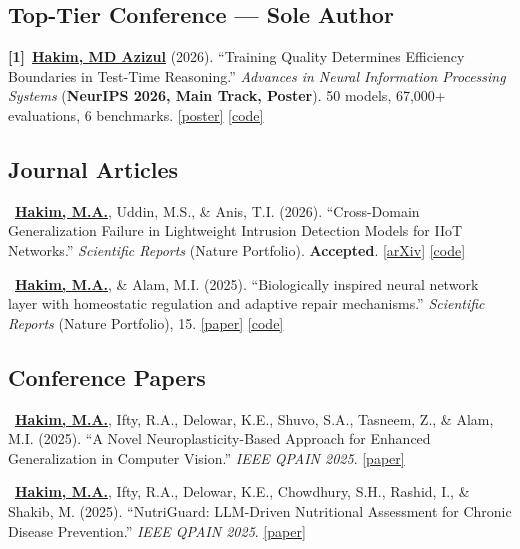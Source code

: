 \documentclass[10pt, a4paper]{article}
\begin{document}
\subsection*{Top-Tier Conference --- Sole Author}
\noindent
\textbf{[1]}\ \underline{\textbf{Hakim, MD Azizul}} (2026).
``Training Quality Determines Efficiency Boundaries in Test-Time Reasoning.''
\textit{Advances in Neural Information Processing Systems} (\textbf{NeurIPS 2026, Main Track, Poster}).
50 models, 67{,}000+ evaluations, 6 benchmarks.
\href{https://neurips.cc/virtual/2026/loc/sydney/poster/150721}{[poster]}
\href{https://github.com/logicsame/Training-Quality-Determines-Efficiency-Boundaries-in-Test-Time-Reasoning}{[code]}

\subsection*{Journal Articles}
\noindent
[J1]\ \underline{\textbf{Hakim, M.A.}}, Uddin, M.S., \& Anis, T.I. (2026).
``Cross-Domain Generalization Failure in Lightweight Intrusion Detection Models for IIoT Networks.''
\textit{Scientific Reports} (Nature Portfolio). \textbf{Accepted}.
\href{https://arxiv.org/abs/2607.00553}{[arXiv]}
\href{https://github.com/logicsame/Cross-Domain-Generalization-Failure-in-Lightweight-Intrusion-Detection-Models-for-IIoT-Networks}{[code]}

\smallskip
\noindent
[J2]\ \underline{\textbf{Hakim, M.A.}}, \& Alam, M.I. (2025).
``Biologically inspired neural network layer with homeostatic regulation and adaptive repair mechanisms.''
\textit{Scientific Reports} (Nature Portfolio), 15.
\href{https://doi.org/10.1038/s41598-025-09114-8}{[paper]}
\href{https://github.com/logicsame/bio-logical-self-healing-neural-system}{[code]}

\subsection*{Conference Papers}
\noindent
[C1]\ \underline{\textbf{Hakim, M.A.}}, Ifty, R.A., Delowar, K.E., Shuvo, S.A., Tasneem, Z., \& Alam, M.I. (2025).
``A Novel Neuroplasticity-Based Approach for Enhanced Generalization in Computer Vision.''
\textit{IEEE QPAIN 2025}.
\href{https://doi.org/10.1109/QPAIN66474.2025.11172203}{[paper]}

\smallskip
\noindent
[C2]\ \underline{\textbf{Hakim, M.A.}}, Ifty, R.A., Delowar, K.E., Chowdhury, S.H., Rashid, I., \& Shakib, M. (2025).
``NutriGuard: LLM-Driven Nutritional Assessment for Chronic Disease Prevention.''
\textit{IEEE QPAIN 2025}.
\href{https://doi.org/10.1109/QPAIN66474.2025.11171750}{[paper]}
\end{document}
